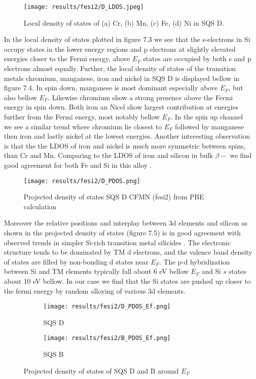 \begin{figure}[H]
	\centering
	\texttt{[image: results/fesi2/D\_LDOS.jpeg]}
	\caption{Local density of states of (a) Cr, (b) Mn, (c) Fe, (d) Ni in SQS D.}
\end{figure}   
  
In the local density of states plotted in figure 7.3 we see that the s-electrons in Si occupy states in the lower energy regions and p electrons at slightly elevated energies closer to the Fermi energy, above $E_F$ states are occupied by both s and p electrons almost equally. Further, the local density of states of the transition metals chromium, manganese, iron and nickel in SQS D is displayed bellow in figure 7.4. In spin down, manganese is most dominant especially above $E_F$, but also bellow $E_F$. Likewise chromium show a strong presence above the Fermi energy in spin down. Both iron an Nicel show largest contribution at energies further from the Fermi energy, most notably bellow $E_F$. In the spin up channel we see a similar trend where chromium lie closest to $E_F$ followed by manganese then iron and lastly nickel at the lowest energies. Another interesting observation is that the the LDOS of iron and nickel is much more symmetric between spins, than Cr and Mn. Comparing to the LDOS of iron and silicon in bulk $\beta-$  \cite{doi:10.1063/1.346415} we find good agreement for both Fe and Si in this alloy .

\begin{figure}[H]
	\centering
	\texttt{[image: results/fesi2/D\_PDOS.png]}
	\caption{Projected density of states SQS D CFMN (fesi2) from PBE calculation}
\end{figure} 

Moreover the relative positions and interplay between 3d elements and silicon as shown in the projected density of states (figure 7.5) is in good agreement with observed trends in simpler Si-rich transition metal silicides \cite{lange1997electronic}. The electronic structure tends to be dominated by TM d electrons, and the valence band density of states are filled by non-bonding d states near $E_F$. The p-d hybridization between Si and TM elements typically fall about 6 eV bellow $E_F$ and Si $s$ states about 10 eV bellow. In our case we find that the Si states are pushed up closer to the fermi energy by random alloying of various 3d elements.    

  
\begin{figure}[H]
	\centering
	\begin{subfigure}{.45\textwidth}
			\texttt{[image: results/fesi2/D\_PDOS\_Ef.png]}
			\caption{SQS D}		
	\end{subfigure}
	\hspace{0.5cm}
	\begin{subfigure}{.45\textwidth}
		\texttt{[image: results/fesi2/B\_PDOS\_Ef.png]}
		\caption{SQS B}		
	\end{subfigure}
	\caption{Projected density of states of SQS D and B around $E_F$}
\end{figure}

